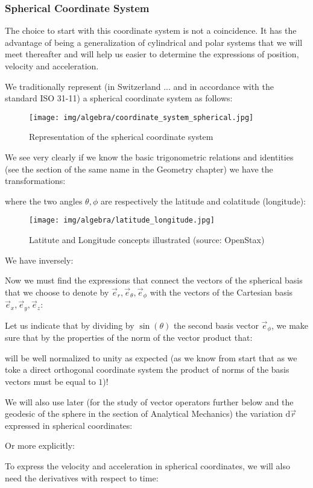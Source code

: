 	\pagebreak
	\subsubsection{Spherical Coordinate System}
	The choice to start with this coordinate system is not a coincidence. It has the advantage of being a generalization of cylindrical and polar systems that we will meet thereafter and will help us easier to determine the expressions of position, velocity and acceleration.
	
	We traditionally represent (in Switzerland ... and in accordance with the standard ISO 31-11) a spherical coordinate system as follows:
	\begin{figure}[H]
		\centering
		\texttt{[image: img/algebra/coordinate\_system\_spherical.jpg]}
		\caption{Representation of the spherical coordinate system}
	\end{figure}
	We see very clearly if we know the basic trigonometric relations and identities (see the section of the same name in the Geometry chapter) we have the transformations:
	
	
	where the two angles $\theta, \phi$ are respectively the latitude and colatitude (longitude):
	\begin{figure}[H]
		\centering
		\texttt{[image: img/algebra/latitude\_longitude.jpg]}
		\caption{Latitute and Longitude concepts illustrated (source: OpenStax)}
	\end{figure}
	We have inversely:
	
	Now we must find the expressions that connect the vectors of the spherical basis that we choose to denote by $\vec{e}_r,\vec{e}_\theta,\vec{e}_\phi$ with the vectors of the Cartesian basis $\vec{e}_x,\vec{e}_y,\vec{e}_z$:
	
	Let us indicate that by dividing by $\sin(\theta)$ the second basis vector $\vec{e}_\phi$, we make sure that by the properties of the norm of the vector product that:
	
	will be well normalized to unity as expected (as we know from start that as we toke a direct orthogonal coordinate system the product of norms of the basis vectors must be equal to $1$)!
	
	
	We will also use later (for the study of vector operators further below and the geodesic of the sphere in the section of Analytical Mechanics) the variation $\mathrm{d}\vec{r}$ expressed in spherical coordinates:
	
	Or more explicitly:
	
	To express the velocity and acceleration in spherical coordinates, we will also need the derivatives with respect to time:
	
